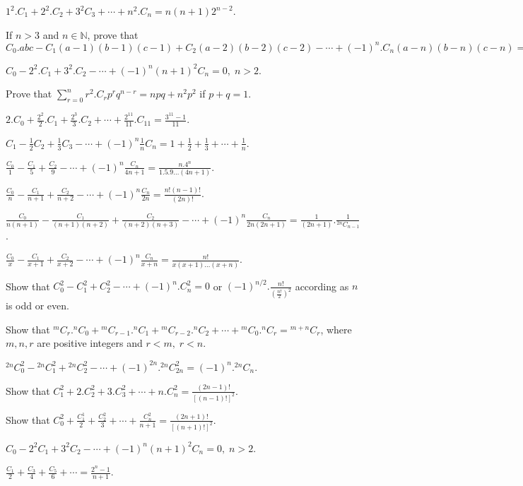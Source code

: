 \item $1^2.C_1 + 2^2.C_2 + 3^2C_3 + \cdots + n^2.C_n = n(n + 1)2^{n - 2}$.
\item If $n>3$ and $n\in\mathbb{N}$, prove that $C_0.abc - C_1(a - 1)(b - 1)(c - 1) + C_2(a - 2)(b - 2)(c -2)- \cdots +
  (-1)^n.C_n(a - n)(b - n)(c - n) = 0$
\item $C_0 - 2^2.C_1 + 3^2.C_2 - \cdots + (-1)^n(n + 1)^2C_n = 0,\;n>2$.
\item Prove that $\displaystyle\sum_{r=0}^nr^2.C_rp^rq^{n- r} = npq + n^2p^2$ if $p + q = 1$.
\item $2.C_0 + \frac{2^2}{2}.C_1 + \frac{2^3}{3}.C_2 + \cdots + \frac{2^{11}}{11}.C_{11} = \frac{3^{11} - 1}{11}$.
\item $C_1 - \frac{1}{2}C_2 + \frac{1}{3}C_3 - \cdots + (-1)^n\frac{1}{n}C_n = 1 + \frac{1}{2} + \frac{1}{3} + \cdots +
  \frac{1}{n}$.
\item $\frac{C_0}{1} - \frac{C_1}{5} + \frac{C_2}{9} - \cdots + (-1)^n\frac{C_n}{4n + 1} = \frac{n.4^n}{1.5.9\ldots (4n + 1)}$.
\item $\frac{C_0}{n} - \frac{C_1}{n+ 1} + \frac{C_2}{n + 2} - \cdots + (-1)^n\frac{C_n}{2n} = \frac{n!(n - 1)!}{(2n)!}$.
\item $\frac{C_0}{n(n + 1)} - \frac{C_1}{(n + 1)(n+ 2)} + \frac{C_2}{(n + 2)(n + 3)} - \cdots + (-1)^n\frac{C_n}{2n(2n + 1)} =
  \frac{1}{(2n + 1)}.\frac{1}{{}^{2n}C_{n - 1}}$.
\item $\frac{C_0}{x} - \frac{C_1}{x + 1} + \frac{C_2}{x + 2} - \cdots + (-1)^n\frac{C_n}{x + n} = \frac{n!}{x(x + 1)\ldots(x + n)}$.
\item Show that $C_0^2 - C_1^2 + C_2^2 - \cdots + (-1)^n.C_n^2 = 0$ or $(-1)^{n/2}.\frac{n!}{\left(\frac{n!}{2}\right)^2}$
  according as $n$ is odd or even.
\item Show that ${}^mC_r.{}^nC_0 + {}^mC_{r-1}.{}^nC_1 + {}^mC_{r-2}.{}^nC_2 + \cdots + {}^mC_0.{}^nC_r = {}^{m + n}C_r$, where $m,
  n, r$ are positive integers and $r<m,\;r<n$.
\item ${}^{2n}C_0^2 - {}^{2n}C_1^2 + {}^{2n}C_2^2 - \cdots + (-1)^{2n}.{}^{2n}C_{2n}^2 = (-1)^n.{}^{2n}C_n$.
\item Show that $C_1^2 + 2.C_2^2 + 3.C_3^2 + \cdots + n.C_n^2 = \frac{(2n - 1)!}{[(n - 1)!]^2}$.
\item Show that $C_0^2 + \frac{C_1^1}{2} + \frac{C_2^2}{3} + \cdots + \frac{C_n^2}{n + 1} = \frac{(2n + 1)!}{[(n + 1)!]^2}$.
\item $C_0 - 2^2C_1 + 3^2C_2 - \cdots + (-1)^n(n + 1)^2C_n = 0,\;n>2$.
\item $\frac{C_1}{2} + \frac{C_3}{4} + \frac{C_5}{6} + \cdots = \frac{2^n - 1}{n + 1}$.
